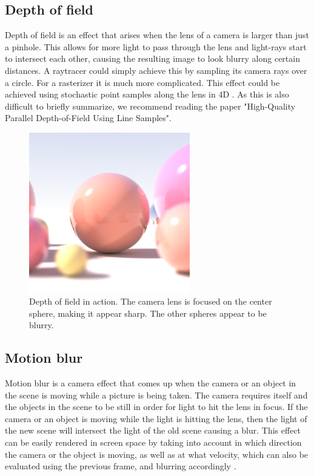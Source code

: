 \documentclass{ACGSeminar}
\begin{document}
	\subsection{Depth of field}
		Depth of field is an effect that arises when the lens of a camera is larger than just a pinhole. This allows for more light to pass through the lens and light-rays start to intersect each other, causing the resulting image to look blurry along certain distances. A raytracer could simply achieve this by sampling its camera rays over a circle. For a rasterizer it is much more complicated. This effect could be achieved using stochastic point samples along the lens in 4D \cite{DOF2}. As this is also difficult to briefly summarize, we recommend reading the paper "High-Quality Parallel Depth-of-Field Using Line Samples". 
		\begin{figure}[htb!]%
			\begin{center}%
				\includegraphics[width=7cm]{img/raytraced_depth_of_field.png}
			\end{center}%
			\caption{Depth of field in action. The camera lens is focused on the center sphere, making it appear sharp. The other spheres appear to be blurry.}%
			\label{fig:depth_of_field}%
		\end{figure}%

	\subsection{Motion blur}
		Motion blur is a camera effect that comes up when the camera or an object in the scene is moving while a picture is being taken. The camera requires itself and the objects in the scene to be still in order for light to hit the lens in focus. If the camera or an object is moving while the light is hitting the lens, then the light of the new scene will intersect the light of the old scene causing a blur. This effect can be easily rendered in screen space by taking into account in which direction the camera or the object is moving, as well as at what velocity, which can also be evaluated using the previous frame, and blurring accordingly \cite{MOB}.
\end{document}
